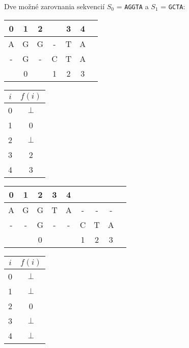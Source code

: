 \bigskip
    
\begin{example}
    Dve možné zarovnania sekvencií $S_0$ = \texttt{AGGTA} a $S_1$ = \texttt{GCTA}:
    
    \bigskip
    
    \begin{minipage}{2.5in}
        \begin{tabular}{ c c c c c c c }
            0 & 1 & 2 &   & 3 & 4 \\ \hline     
            A & G & G & - & T & A \\
            - & G & - & C & T & A \\ \hline
              & 0 &   & 1 & 2 & 3 \\   
        \end{tabular}
    \end{minipage}
    \begin{minipage}{2.5in}
        \begin{tabular}{ | c | c | }
            \hline            
            $i$ & $f(i)$ \\ \hline             
            0   & $\bot$ \\ \hline 
            1   & 0      \\ \hline
            2   & $\bot$ \\ \hline
            3   & 2      \\ \hline
            4   & 3      \\ \hline
        \end{tabular}
    \end{minipage}
        
    \bigskip
        
    \begin{minipage}{2.5in}
        \begin{tabular}{ c c c c c c c c c }
            0 & 1 & 2 & 3 & 4 &           \\ \hline     
            A & G & G & T & A & - & - & - \\
            - & - & G & - & - & C & T & A \\ \hline
            &   & 0 &   &   & 1 & 2 & 3 \\   
        \end{tabular}
    \end{minipage}
    \begin{minipage}{2.5in}
        \begin{tabular}{ | c | c | }
            \hline            
            $i$ & $f(i)$ \\ \hline             
            0   & $\bot$ \\ \hline 
            1   & $\bot$ \\ \hline
            2   & 0      \\ \hline
            3   & $\bot$ \\ \hline
            4   & $\bot$ \\ \hline
        \end{tabular}
    \end{minipage}        
\end{example}
    
